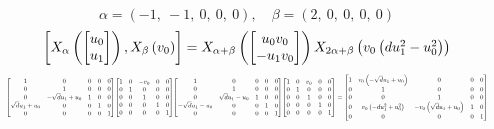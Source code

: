 \documentclass[11pt]{article}
\theoremstyle{definition}
\begin{document}
\[
\alpha = \left( -1, \  -1, \  0, \  0, \  0\right), \quad \beta = \left( 2, \  0, \  0, \  0, \  0\right)
\]
\[
\scaletoalign{\textwidth}{\left[ X_{\alpha}\left(\left[\begin{matrix}u_{0}\\u_{1}\end{matrix}\right]\right), X_{\beta}\left(v_{0}\right) \right] = X_{\alpha + \beta}\left(\left[\begin{matrix}u_{0} v_{0}\\- u_{1} v_{0}\end{matrix}\right]\right) X_{2\alpha + \beta}\left(v_{0} \left(d u_{1}^{2} - u_{0}^{2}\right)\right)}
\]
\[
\scaletoalign{\textwidth}{{\left[\begin{matrix}1 & 0 & 0 & 0 & 0\\0 & 1 & 0 & 0 & 0\\0 & - \sqrt{d} u_{1} + u_{0} & 1 & 0 & 0\\\sqrt{d} u_{1} + u_{0} & 0 & 0 & 1 & 0\\0 & 0 & 0 & 0 & 1\end{matrix}\right]} {\left[\begin{matrix}1 & 0 & - v_{0} & 0 & 0\\0 & 1 & 0 & 0 & 0\\0 & 0 & 1 & 0 & 0\\0 & 0 & 0 & 1 & 0\\0 & 0 & 0 & 0 & 1\end{matrix}\right]} {\left[\begin{matrix}1 & 0 & 0 & 0 & 0\\0 & 1 & 0 & 0 & 0\\0 & \sqrt{d} u_{1} - u_{0} & 1 & 0 & 0\\- \sqrt{d} u_{1} - u_{0} & 0 & 0 & 1 & 0\\0 & 0 & 0 & 0 & 1\end{matrix}\right]} {\left[\begin{matrix}1 & 0 & v_{0} & 0 & 0\\0 & 1 & 0 & 0 & 0\\0 & 0 & 1 & 0 & 0\\0 & 0 & 0 & 1 & 0\\0 & 0 & 0 & 0 & 1\end{matrix}\right]} = {\left[\begin{matrix}1 & v_{0} \left(- \sqrt{d} u_{1} + u_{0}\right) & 0 & 0 & 0\\0 & 1 & 0 & 0 & 0\\0 & 0 & 1 & 0 & 0\\0 & v_{0} \left(- d u_{1}^{2} + u_{0}^{2}\right) & - v_{0} \left(\sqrt{d} u_{1} + u_{0}\right) & 1 & 0\\0 & 0 & 0 & 0 & 1\end{matrix}\right]}}
\]
\end{document}
